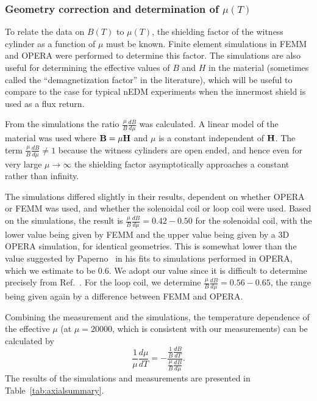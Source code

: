 




\subsubsection{Geometry correction and determination of $\mu(T)$\label{sec:axialsims}}

To relate the data on $B(T)$ to $\mu(T)$, the shielding factor of the
witness cylinder as a function of $\mu$ must be known.  Finite element
simulations in FEMM and OPERA were performed to determine this factor.
The simulations are also useful for determining the effective values
of $B$ and $H$ in the material (sometimes called the ``demagnetization
factor'' in the literature), which will be useful to compare to the
case for typical nEDM experiments when the innermost shield is used as
a flux return.


From the simulations the ratio $\frac{\mu}{B} \frac{dB}{d\mu}$ was
calculated.  A linear model of the material was used where
$\bold{B}=\mu \bold{H}$ and $\mu$ is a constant independent of
$\bold{H}$.  The term $\frac{\mu}{B}\frac{dB}{d\mu}\neq 1$ because the
witness cylinders are open ended, and hence even for very large
$\mu\rightarrow\infty$ the shielding factor asymptotically approaches
a constant rather than infinity.

The simulations differed slightly in their results, dependent on
whether OPERA or FEMM was used, and whether the solenoidal coil or
loop coil were used.
Based on the simulations, the result is
$\frac{\mu}{B}\frac{dB}{d\mu}=0.42-0.50$ for the solenoidal coil, with
the lower value being given by FEMM and the upper value being given by
a 3D OPERA simulation, for identical geometries.  This is somewhat
lower than the value suggested by
Paperno~\cite{bib:paperno-open-ended} in his fits to simulations
performed in OPERA, which we estimate to be 0.6.  We adopt our value
since it is difficult to determine precisely from
Ref.~\cite{bib:paperno-open-ended}.  For the loop coil, we determine
$\frac{\mu}{B}\frac{dB}{d\mu}=0.56-0.65$, the range being given again
by a difference between FEMM and OPERA.


Combining the measurement and the simulations, the temperature
dependence of the effective $\mu$ (at $\mu=20 000$, which is consistent
with our measurements) can be calculated by
\begin{equation}
\frac{1}{\mu}\frac{d\mu}{dT}=-\frac{\frac{1}{B}\frac{dB}{dT}}{\frac{\mu}{B}\frac{dB}{d\mu}}.
\end{equation}
The results of the simulations and measurements are presented in
Table~\ref{tab:axialsummary}.

